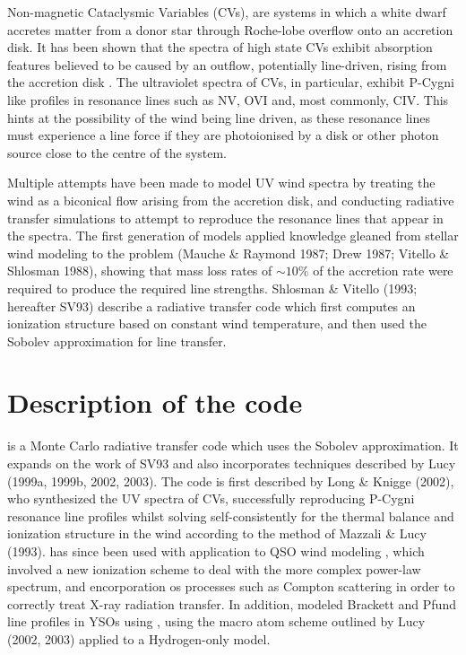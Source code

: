 \documentclass[useAMS,usenatbib, onecolumn]{mn2ejm}
\begin{document}
Non-magnetic Cataclysmic Variables (CVs), are systems in which a white dwarf accretes matter from a donor star
through Roche-lobe overflow onto an accretion disk. It has been shown that the spectra of high state CVs
exhibit absorption features believed to be caused by an outflow, potentially line-driven,
rising from the accretion disk \citep{cordova1982}. 
The ultraviolet spectra of CVs, in particular, exhibit P-Cygni like profiles in resonance lines such as 
NV, OVI and, most commonly, CIV. This hints at the possibility of the wind being line driven, 
as these resonance lines must experience a line force if they are photoionised by a disk or other photon source
close to the centre of the system.


Multiple attempts have been made to model UV wind spectra by treating the wind
as a biconical flow arising from the accretion disk, and conducting radiative transfer simulations to attempt
to reproduce the resonance lines that appear in the spectra. The first generation of models
applied knowledge gleaned from stellar wind modeling to the problem (Mauche \& Raymond
1987; Drew 1987; Vitello \& Shlosman 1988), showing that mass loss rates of $\sim10\%$ of the accretion rate
 were required to produce the required line strengths.
Shlosman \& Vitello (1993; hereafter SV93) describe a radiative transfer code which first computes
an ionization structure based on constant wind temperature, and then used the Sobolev approximation
for line transfer.







%
%

\section{Description of the code}

\py is a Monte Carlo radiative transfer code which uses the Sobolev approximation.  
It expands on the work of SV93 and also incorporates techniques described by
Lucy (1999a, 1999b, 2002, 2003). The code is first described by Long \& Knigge (2002),
who synthesized the UV spectra of CVs, successfully reproducing P-Cygni resonance line profiles
whilst solving self-consistently for the thermal balance and ionization structure in the wind
according to the method of Mazzali \& Lucy (1993). \py has since been used with application
to QSO wind modeling \citep{higginbottom2013}, which involved a new ionization scheme to deal with the
more complex power-law spectrum, and encorporation os processes such as Compton scattering in order
to correctly treat X-ray radiation transfer. In addition, \citep{simmacro2005} modeled
Brackett and Pfund line profiles in YSOs using \py, using the macro atom scheme outlined by Lucy (2002, 2003) applied
to a Hydrogen-only model.
\end{document}
